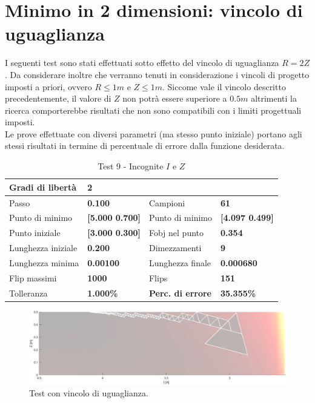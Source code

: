 \documentclass[a4paper, 11pt]{article}
\begin{document}
\newpage
\section{Minimo in 2 dimensioni: vincolo di uguaglianza}

I seguenti test sono stati effettuati sotto effetto del vincolo di uguaglianza $R
= 2Z$. Da considerare inoltre che verranno tenuti in considerazione i vincoli
di progetto imposti a priori, ovvero $R \le 1m$ e $Z \le 1m$. Siccome vale il
vincolo descritto precedentemente, il valore di $Z$ non potrà essere superiore a
$0.5m$ altrimenti la ricerca comporterebbe risultati che non sono compatibili
con i limiti progettuali imposti. \\
Le prove effettuate con diversi parametri (ma stesso punto iniziale) portano
agli stessi risultati in termine di percentuale di errore dalla funzione desiderata.

\begin{table}[h]
	\caption{Test 9 - Incognite $I$ e $Z$}
	\begin{center}
	\begin{tabular}{|l|l|l|l|} 
	\hline 
	Gradi di libertà & \textbf{2} &  &  \\ \hline 
	Passo & \textbf{0.100} & Campioni & \textbf{61} \\ \hline 
	Punto di minimo & \textbf{{[}5.000 0.700{]}} & Punto di minimo & \textbf{{[}4.097 0.499{]}} \\ \hline 
	Punto iniziale & \textbf{{[}3.000 0.300{]}} & Fobj nel punto & \textbf{0.354} \\ \hline 
	Lunghezza iniziale & \textbf{0.200} & Dimezzamenti & \textbf{9} \\ \hline 
	Lunghezza minima & \textbf{0.00100} & Lunghezza finale & \textbf{0.000680} \\ \hline
	Flip massimi & \textbf{1000} & Flips & \textbf{151} \\ \hline 
	Tolleranza & \textbf{1.000\%} & \textbf{Perc. di errore} & \textbf{35.355\%} \\ \hline 
	\end{tabular} 
	\end{center}
	\end{table}

\begin{figure}[H]
	\centering
		\includegraphics[width=15cm]{assets/figure11}
		\caption{Test con vincolo di uguaglianza.}
\end{figure}
\end{document}
